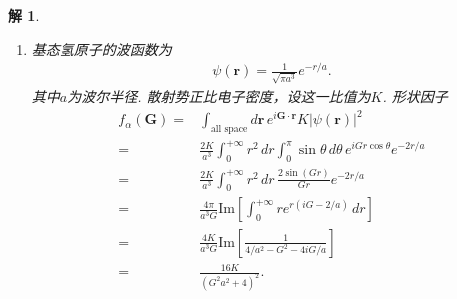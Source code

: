 \documentclass[UTF8,10pt,a4paper]{article}
\theoremstyle{Problem}
\theoremstyle{Solution}
\newtheorem*{sol}{解}
\providecommand{\abs}[1]{\left\lvert#1\right\rvert}
\begin{document}
\begin{sol}
\begin{enumerate}
\begin{align}
\begin{array}{ll}
                V_0,&\abs{\bm{r}}\leq a,\\
                0,&\abs{\bm{r}}>a.
            \end{array}\right.
        \end{align}
        则形状因子
        \begin{align}
            \nonumber f_{\alpha}(\bm{G})=&\int_{\text{all space}}d\bm{r}\,V_{\alpha}(\bm{r})e^{i\bm{G}\cdot\bm{r}}\\
            \nonumber&(\text{其中$\theta$为$\bm{G}$和$\bm{r}$间的夹角})\\
            \nonumber=&2\pi V_0\int_0^ar^2\,dr\int_0^{\pi}\sin\theta\,d\theta\,e^{iGr\cos\theta}\\
            \nonumber=&2\pi V_0\int_0^ar^2\,dr\int_{-1}^1d(\cos\theta)\,e^{iGr\cos\theta}\\
            \nonumber=&2\pi V_0\int_0^ar^2\,dr\frac{2\sin(Gr)}{Gr}\\
            \nonumber=&\frac{4\pi V_0}{G^2}\left[\frac{\sin(Ga)}{G}-a\cos(Ga)\right]\\
            =&3\frac{4\pi}{3}V_0a^3\frac{\sin x-x\cos x}{x^3}.
        \end{align}
        其中$x=Gr$. 因为原子周围的电场强度大小正比核电荷数，$V_0\propto Z_{\alpha}$，故
        \begin{align}
            f_{\alpha}(\bm{G})\propto 3Z_{\alpha}\frac{\sin x-x\cos x}{x^3}.
        \end{align}
        \item[(c)] 基态氢原子的波函数为
        \begin{align}
            \psi(\bm{r})=\frac{1}{\sqrt{\pi a^3}}e^{-r/a}.
        \end{align}
        其中$a$为波尔半径. 散射势正比电子密度，设这一比值为$K$. 形状因子
        \begin{align}
            \nonumber f_{\alpha}(\bm{G})=&\int_{\text{all space}}d\bm{r}\,e^{i\bm{G}\cdot\bm{r}}K\abs{\psi(\bm{r})}^2\\
            \nonumber=&\frac{2K}{a^3}\int_0^{+\infty}r^2\,dr\int_0^{\pi}\sin\theta\,d\theta\,e^{iGr\cos\theta}e^{-2r/a}\\
            \nonumber=&\frac{2K}{a^3}\int_0^{+\infty}r^2\,dr\,\frac{2\sin(Gr)}{Gr}e^{-2r/a}\\
            \nonumber=&\frac{4\pi}{a^3G}\text{Im}\left[\int_0^{+\infty}re^{r(iG-2/a)}\,dr\right]\\
            \nonumber=&\frac{4K}{a^3G}\text{Im}\left[\frac{1}{4/a^2-G^2-4iG/a}\right]\\
            =&\frac{16K}{(G^2a^2+4)^2}.
        \end{align}
    \end{enumerate}
\end{sol}
\end{document}
